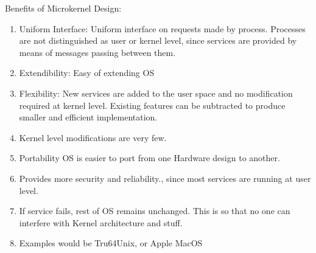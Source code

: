 \documentclass[11pt]{article}
\begin{document}
Benefits of Microkernel Design: 
\begin{enumerate}
	\item Uniform Interface: Uniform interface on requests made by process. Processes are not distinguished as user or kernel level, since services are provided by means of messages passing between them. 
	\item Extendibility: Easy of extending OS
	\item Flexibility: New services are added to the user space and no modification required at kernel level. Existing features can be subtracted to produce smaller and efficient implementation. 
	\item Kernel level modifications are very few. 
	\item Portability OS is easier to port from one Hardware design to another. 
	\item Provides more security and reliability., since most services are running at user level. 
	\item If service fails, rest of OS remains unchanged. This is so that no one can interfere with Kernel architecture and stuff. 
	\item Examples would  be Tru64Unix, or Apple MacOS
\end{enumerate}
\end{document}
